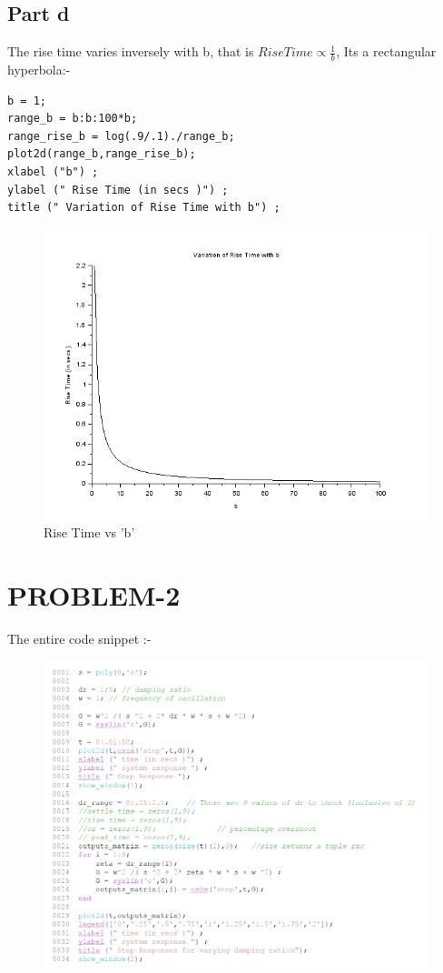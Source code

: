 \documentclass[12pt]{article}
\begin{document}
\subsection*{Part d}  
    The rise time varies inversely with b, that is $RiseTime\propto\frac{1}{b}$, Its a rectangular hyperbola:-
    \begin{verbatim}
b = 1;
range_b = b:b:100*b;
range_rise_b = log(.9/.1)./range_b;
plot2d(range_b,range_rise_b);
xlabel ("b") ;
ylabel (" Rise Time (in secs )") ;
title (" Variation of Rise Time with b") ;
    \end{verbatim}
    \begin{figure}[H]
        \centering
        \includegraphics[scale=0.8]{q1_d.png}
        \caption{Rise Time vs 'b'}
        \label{fig:my_label}
    \end{figure}
    
\section{PROBLEM-2}
The entire code snippet :-
    \begin{figure}[H]
        \centering
        \includegraphics[scale=0.8]{q2_code.png}
    \end{figure}
\end{document}
